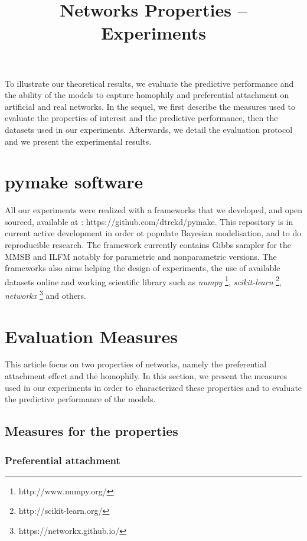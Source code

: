 \documentclass[a4paper, 12pt]{article}
\title{Networks Properties -- Experiments}
\begin{document}
\maketitle
\tableofcontents

To illustrate our theoretical results, we evaluate the predictive performance and the ability of the models to capture homophily and preferential attachment on artificial and real networks. In the sequel, we first describe the measures used to evaluate the properties of interest and the predictive performance, then the datasets used in our experiments. Afterwards, we detail the evaluation protocol and we present the experimental results.

\section{pymake software}
All our experiments were realized with a frameworks that we developed, and open sourced, available at : https://github.com/dtrckd/pymake. This repository is in current active development in order ot populate Bayesian modelisation, and to do reproducible research. The framework currently contains Gibbs sampler for the MMSB and ILFM notably for parametric and nonparametric versions. The frameworks also aims helping the design of experiments, the use of available datasets online and working scientific library such as \emph{numpy} \footnote{http://www.numpy.org/}, \emph{scikit-learn} \footnote{http://scikit-learn.org/}, \emph{networkx} \footnote{https://networkx.github.io/} and others.

\section{Evaluation Measures}
This article focus on two properties of networks, namely the preferential attachment effect and the homophily. In this section, we present the measures used in our experiments in order to characterized these properties and to evaluate the predictive performance of the models.

\subsection{Measures for the properties}

\subsubsection{Preferential attachment}
\label{sec:experiments-burst}
\end{document}
